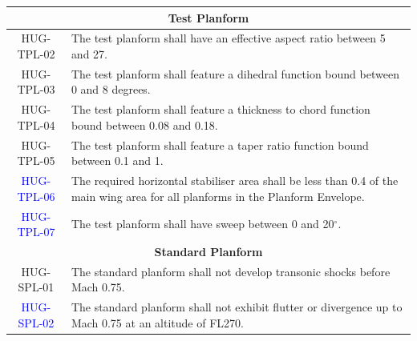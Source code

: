 \begin{longtable}{|c|p{13.5cm}|}
\multicolumn{2}{|c|}{\textbf{Test Planform}}\\\hline
HUG-TPL-02 & The test planform shall have an effective aspect ratio between 5 and 27. \\\hline
HUG-TPL-03 & The test planform shall feature a dihedral function bound between 0 and 8 degrees.\\\hline
HUG-TPL-04 & The test planform shall feature a thickness to chord function bound between 0.08 and 0.18. \\\hline
HUG-TPL-05 & The test planform shall feature a taper ratio function bound between 0.1 and 1. \\\hline
\textcolor{blue}{HUG-TPL-06} & The required horizontal stabiliser area shall be less than 0.4 of the main wing area for all planforms in the Planform Envelope. \\\hline
\textcolor{blue}{HUG-TPL-07} & The test planform shall have sweep between 0 and 20$^\circ$. \\\hline

\multicolumn{2}{|c|}{\textbf{Standard Planform}}\\\hline
HUG-SPL-01 &The standard planform shall not develop transonic shocks before Mach 0.75. %
\\\hline
\textcolor{blue}{HUG-SPL-02} & The standard planform shall not exhibit flutter or divergence up to Mach 0.75 at an altitude of FL270. \\\hline

\end{longtable}














